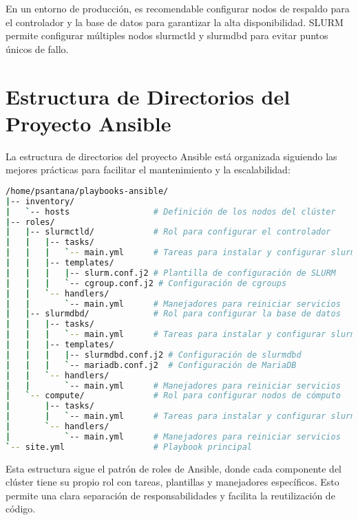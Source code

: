 \documentclass[12pt,a4paper]{article}
\begin{document}
\begin{warningbox}
En un entorno de producción, es recomendable configurar nodos de respaldo para el controlador y la base de datos para garantizar la alta disponibilidad. SLURM permite configurar múltiples nodos slurmctld y slurmdbd para evitar puntos únicos de fallo.
\end{warningbox}

\section{Estructura de Directorios del Proyecto Ansible}
\newpage

La estructura de directorios del proyecto Ansible está organizada siguiendo las mejores prácticas para facilitar el mantenimiento y la escalabilidad:

\begin{lstlisting}[language=bash, caption=Estructura de directorios del proyecto]
/home/psantana/playbooks-ansible/
|-- inventory/
|   `-- hosts                 # Definición de los nodos del clúster
|-- roles/
|   |-- slurmctld/            # Rol para configurar el controlador
|   |   |-- tasks/
|   |   |   `-- main.yml      # Tareas para instalar y configurar slurmctld
|   |   |-- templates/
|   |   |   |-- slurm.conf.j2 # Plantilla de configuración de SLURM
|   |   |   `-- cgroup.conf.j2 # Configuración de cgroups
|   |   `-- handlers/
|   |       `-- main.yml      # Manejadores para reiniciar servicios
|   |-- slurmdbd/             # Rol para configurar la base de datos
|   |   |-- tasks/
|   |   |   `-- main.yml      # Tareas para instalar y configurar slurmdbd
|   |   |-- templates/
|   |   |   |-- slurmdbd.conf.j2 # Configuración de slurmdbd
|   |   |   `-- mariadb.conf.j2  # Configuración de MariaDB
|   |   `-- handlers/
|   |       `-- main.yml      # Manejadores para reiniciar servicios
|   `-- compute/              # Rol para configurar nodos de cómputo
|       |-- tasks/
|       |   `-- main.yml      # Tareas para instalar y configurar slurmd
|       `-- handlers/
|           `-- main.yml      # Manejadores para reiniciar servicios
`-- site.yml                  # Playbook principal
\end{lstlisting}

Esta estructura sigue el patrón de roles de Ansible, donde cada componente del clúster tiene su propio rol con tareas, plantillas y manejadores específicos. Esto permite una clara separación de responsabilidades y facilita la reutilización de código.
\end{document}
